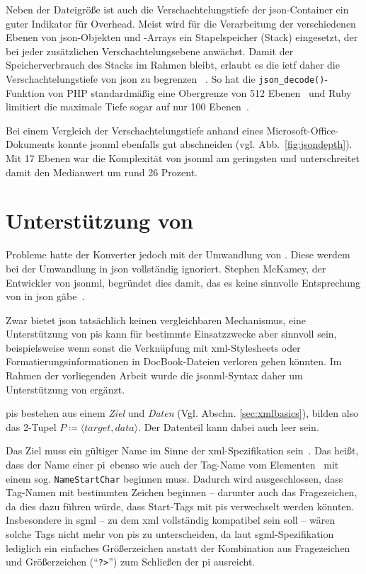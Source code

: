 Neben der Dateigröße ist auch die Verschachtelungstiefe der \acrshort{json}-Container ein guter Indikator für Overhead. Meist wird für die Verarbeitung der verschiedenen Ebenen von \acrshort{json}-Objekten und -Arrays ein Stapelspeicher (Stack) eingesetzt, der bei jeder zusätzlichen Verschachtelungsebene anwächst. Damit der Speicherverbrauch des Stacks im Rahmen bleibt, erlaubt es die \acrshort{ietf} daher die Verschachtelungstiefe von \acrshort{json} zu begrenzen ~\cite[Abschn.~9]{rfc7159}. So hat die \texttt{json_decode()}-Funktion von PHP standardmäßig eine Obergrenze von 512 Ebenen~\cite{php-json} und Ruby limitiert die maximale Tiefe sogar auf nur 100 Ebenen~\cite{ruby-json}.

Bei einem Vergleich der Verschachtelungstiefe anhand eines Microsoft\hyp{}Office\hyp{}Dokuments konnte \acrshort{jsonml} ebenfalls gut abschneiden (vgl. Abb.~\ref{fig:jsondepth}). Mit 17 Ebenen war die Komplexität von \acrshort{jsonml} am geringsten und unterschreitet damit den Medianwert um rund 26 Prozent.

\section{Unterstützung von }

Probleme hatte der Konverter jedoch mit der Umwandlung von . Diese werdem bei der Umwandlung in \acrshort{json} vollständig ignoriert. Stephen McKamey, der Entwickler von \acrshort{jsonml}, begründet dies damit, das es keine sinnvolle Entsprechung von  in \acrshort{json} gäbe~\cite{mckamey2006xml}.

Zwar bietet \acrshort{json} tatsächlich keinen vergleichbaren Mechanismus, eine Unterstützung von \glspl{pi} kann für bestimmte Einsatzzwecke aber sinnvoll sein, beispielsweise wenn sonst die Verknüpfung mit \acrshort{xml}-Stylesheets oder Formatierungsinformationen in DocBook\hyp{}Dateien verloren gehen könnten. Im Rahmen der vorliegenden Arbeit wurde die \acrshort{jsonml}-Syntax daher um Unterstützung von  ergänzt.

\glspl{pi} bestehen aus einem \emph{Ziel} und \emph{Daten} (Vgl. Abschn. \ref{sec:xmlbasics}), bilden also das 2-Tupel $P \coloneqq \langle target, data \rangle$. Der Datenteil kann dabei auch leer sein.

Das Ziel muss ein gültiger Name im Sinne der \acrshort{xml}-Spezifikation sein~\cite[{Regel~[17]}]{maler2008xml}. Das heißt, dass der Name einer \gls{pi}\ ebenso wie auch der Tag-Name vom Elementen~\cite[{Regel~[40]}]{maler2008xml} mit einem sog. \texttt{NameStartChar} beginnen muss. Dadurch wird ausgeschlossen, dass Tag-Namen mit bestimmten Zeichen beginnen -- darunter auch das Fragezeichen, da dies dazu führen würde, dass Start-Tags mit \glspl{pi} verwechselt werden könnten. Insbesondere in \acrshort{sgml} -- zu dem \acrshort{xml} vollständig kompatibel sein soll -- wären solche Tags nicht mehr von \glspl{pi} zu unterscheiden, da laut \acrshort{sgml}-Spezifikation lediglich ein einfaches Größerzeichen anstatt der Kombination aus Fragezeichen und Größerzeichen (\enquote{\texttt{?>}}) zum Schließen der \gls{pi} ausreicht.

